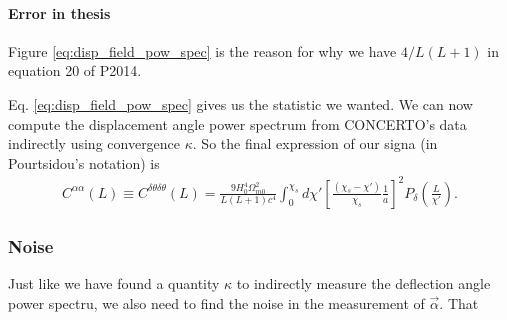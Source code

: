 \documentclass[12pt,a4paper]{article}
\begin{document}
\paragraph{Error in thesis}Figure \eqref{eq:disp_field_pow_spec} is the reason for why we have $ 4/L(L + 1) $ in equation 20 of P2014. 

Eq. \eqref{eq:disp_field_pow_spec} gives us the statistic we wanted. We can now compute the displacement angle power spectrum from CONCERTO's data indirectly using convergence $\kappa$. So the final expression of our signa (in Pourtsidou's notation) is 
\begin{align}
	C^{\alpha\alpha}(L) \equiv C^{\delta\theta\delta\theta}(L) = \frac{9 H_0^4 \Omega_{m0}^2}{L(L+1)c^4}  \int_0^{\chi_s} d\chi' \left[ \frac{(\chi_s - \chi')}{\chi_s} \frac{1}{a} \right]^2 P_\delta\left( \frac{L}{\chi'}\right).
\end{align}

\subsubsection{Noise}
Just like we have found a quantity $ \kappa $ to indirectly measure the deflection angle power spectru, we also need to find the noise in the measurement of $ \vec{\alpha} $. That 
\end{document}

